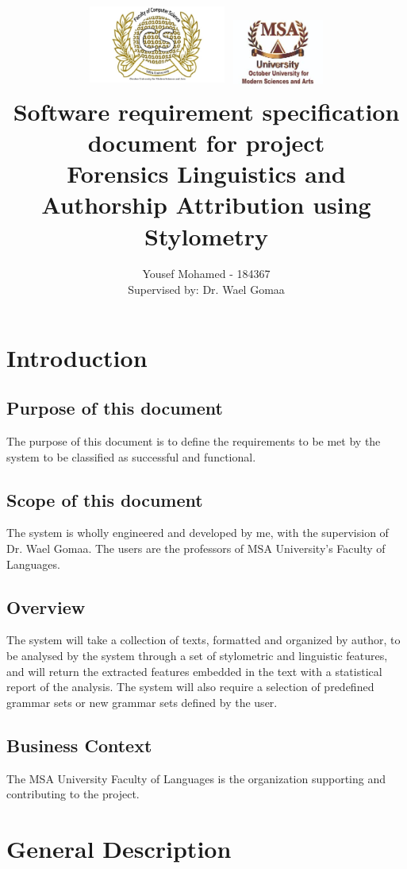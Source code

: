 \documentclass[12pt]{article}
\title{
    {
    \includegraphics[width=4.5cm, height=3cm]{Images/CSLogo.jpg}
    \includegraphics[width=3cm, height=2.5cm]{Images/MSALogo.jpg}
    }
\\
    {
    Software requirement specification document for project \\ Forensics Linguistics and Authorship Attribution using Stylometry
    }
}
\author{Yousef Mohamed - 184367 \\ Supervised by: Dr. Wael Gomaa}
\begin{document}
\maketitle

\section{Introduction}
\subsection{Purpose of this document}
The purpose of this document is to define the requirements to be met by the system to be classified as successful and functional.
\subsection{Scope of this document}
The system is wholly engineered and developed by me, with the supervision of Dr. Wael Gomaa. The users are the professors of MSA University's Faculty of Languages.
\subsection{Overview}
The system will take a collection of texts, formatted and organized by author, to be analysed by the system through a set of stylometric and linguistic features, and will return the extracted features embedded in the text with a statistical report of the analysis. The system will also require a selection of predefined grammar sets or new grammar sets defined by the user.

\subsection{Business Context}
The MSA University Faculty of Languages is the organization supporting and contributing to the project.

\section{General Description}
\end{document}
